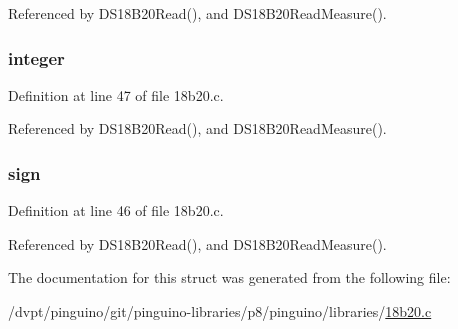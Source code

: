 Referenced by D\-S18\-B20\-Read(), and D\-S18\-B20\-Read\-Measure().

\hypertarget{struct_d_s18_b20___temperature_a4782d1ad82c5fb6d8cc55c968e2811d7}{
\subsubsection[{integer}]{ integer}}\label{struct_d_s18_b20___temperature_a4782d1ad82c5fb6d8cc55c968e2811d7}


Definition at line 47 of file 18b20.\-c.



Referenced by D\-S18\-B20\-Read(), and D\-S18\-B20\-Read\-Measure().

\hypertarget{struct_d_s18_b20___temperature_a3e169a2ae52e52b7b8a61c0edac0abf3}{
\subsubsection[{sign}]{ sign}}\label{struct_d_s18_b20___temperature_a3e169a2ae52e52b7b8a61c0edac0abf3}


Definition at line 46 of file 18b20.\-c.



Referenced by D\-S18\-B20\-Read(), and D\-S18\-B20\-Read\-Measure().



The documentation for this struct was generated from the following file\-:\begin{DoxyCompactItemize}
\item 
/dvpt/pinguino/git/pinguino-\/libraries/p8/pinguino/libraries/\hyperlink{p8_2pinguino_2libraries_218b20_8c}{18b20.\-c}\end{DoxyCompactItemize}

